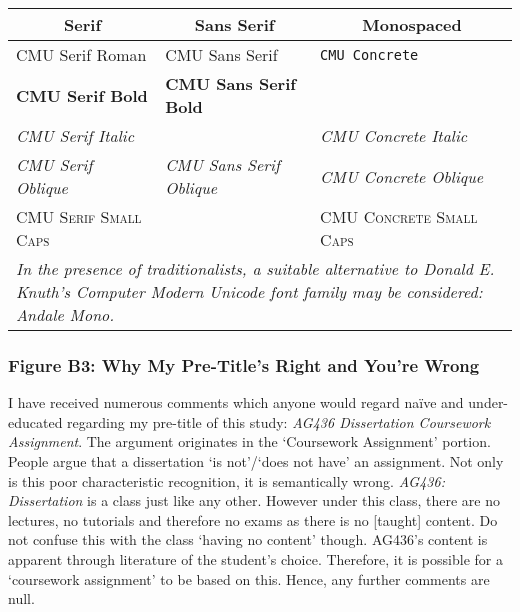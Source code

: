\documentclass[11pt, english]{article}
\begin{document}
		\begin{table}[h]
			\scriptsize
			\renewcommand{\arraystretch}{1.25}
		\begin{center}
			\begin{tabular}{p{4cm}p{4cm}p{4cm}}
			\hline
			\multicolumn{1}{c}{\textbf{Serif}} & \multicolumn{1}{c}{\textbf{Sans Serif}} & \multicolumn{1}{c}{\textbf{Monospaced}}\\
			\hline
			CMU Serif Roman & \textsf{CMU Sans Serif} & \texttt{CMU Concrete}\\
			\textbf{CMU Serif Bold} & \sffamily \textbf{CMU Sans Serif Bold} & \\ 
				\textit{CMU Serif Italic} & & \ttfamily \textit{CMU Concrete Italic}\\
			\textsl{CMU Serif Oblique} & \sffamily \textsl{CMU Sans Serif Oblique} & \ttfamily \textsl{CMU Concrete Oblique}\\
				\textsc{CMU Serif Small Caps} & & \ttfamily \textsc{CMU Concrete Small Caps}\\
			\hline
				\multicolumn{3}{p{13cm}}{\textit{In the presence of traditionalists, a suitable alternative to Donald E. Knuth's Computer Modern Unicode font family may be considered: Andale Mono.}}\\
			\hline
		\end{tabular}
		\end{center}
		\end{table}

		\subsubsection*{Figure B3: Why My Pre-Title’s Right and You’re Wrong}

		I have received numerous comments which anyone would regard na\"{i}ve and under-educated regarding my pre-title of this study: \textit{AG436 Dissertation Coursework Assignment}. The argument originates in the `Coursework Assignment’ portion. People argue that a dissertation `is not’/`does not have’ an assignment. Not only is this poor characteristic recognition, it is semantically wrong. \textit{AG436: Dissertation} is a class just like any other. However under this class, there are no lectures, no tutorials and therefore no exams as there is no [taught] content. Do not confuse this with the class `having no content’ though. AG436’s content is apparent through literature of the student’s choice. Therefore, it is possible for a `coursework assignment’ to be based on this. Hence, any further comments are null.
\end{document}

